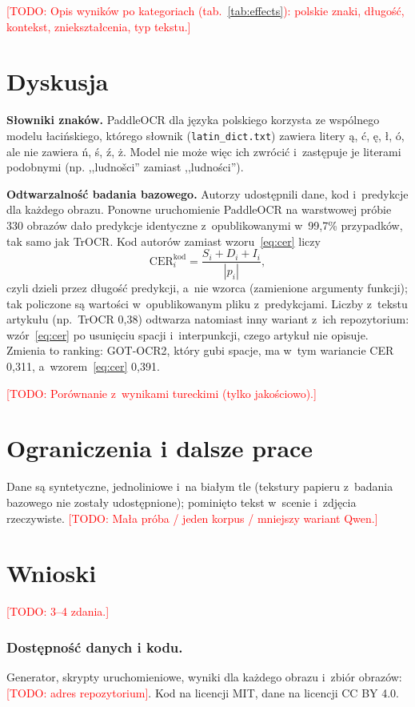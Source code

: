 \documentclass[runningheads]{llncs}
\newcommand{\TODO}[1]{\textcolor{red}{[TODO: #1]}}
\begin{document}
\TODO{Opis wyników po kategoriach (tab.~\ref{tab:effects}): polskie znaki, długość, kontekst,
zniekształcenia, typ tekstu.}

\section{Dyskusja}

\textbf{Słowniki znaków.} PaddleOCR dla języka polskiego korzysta ze wspólnego modelu łacińskiego,
którego słownik (\texttt{latin\_dict.txt}) zawiera litery ą, ć, ę, ł, ó, ale nie zawiera ń, ś, ź, ż.
Model nie może więc ich zwrócić i~zastępuje je literami podobnymi (np. ,,ludnošci'' zamiast
,,ludności'').

\textbf{Odtwarzalność badania bazowego.} Autorzy udostępnili dane, kod i~predykcje dla każdego obrazu.
Ponowne uruchomienie PaddleOCR na warstwowej próbie 330 obrazów dało predykcje identyczne
z~opublikowanymi w~99,7\% przypadków, tak samo jak TrOCR. Kod autorów zamiast wzoru~\eqref{eq:cer} liczy
\begin{equation}\label{eq:cer-authors}
  \mathrm{CER}^{\mathrm{kod}}_i = \frac{S_i + D_i + I_i}{|p_i|},
\end{equation}
czyli dzieli przez długość predykcji, a~nie wzorca (zamienione argumenty funkcji); tak policzone są
wartości w~opublikowanym pliku z~predykcjami. Liczby z~tekstu artykułu (np.\ TrOCR 0,38) odtwarza
natomiast inny wariant z~ich repozytorium: wzór~\eqref{eq:cer} po usunięciu spacji i~interpunkcji,
czego artykuł nie opisuje. Zmienia to ranking: GOT-OCR2, który gubi spacje, ma w~tym wariancie
CER 0,311, a~wzorem~\eqref{eq:cer} 0,391.

\TODO{Porównanie z~wynikami tureckimi (tylko jakościowo).}

\section{Ograniczenia i dalsze prace}

Dane są syntetyczne, jednoliniowe i~na białym tle (tekstury papieru z~badania bazowego nie zostały
udostępnione); pominięto tekst w~scenie i~zdjęcia rzeczywiste. \TODO{Mała próba / jeden korpus /
mniejszy wariant Qwen.}

\section{Wnioski}

\TODO{3--4 zdania.}

\subsubsection*{Dostępność danych i kodu.}
Generator, skrypty uruchomieniowe, wyniki dla każdego obrazu i~zbiór obrazów:
\TODO{adres repozytorium}. Kod na licencji MIT, dane na licencji CC BY 4.0.



\end{document}
